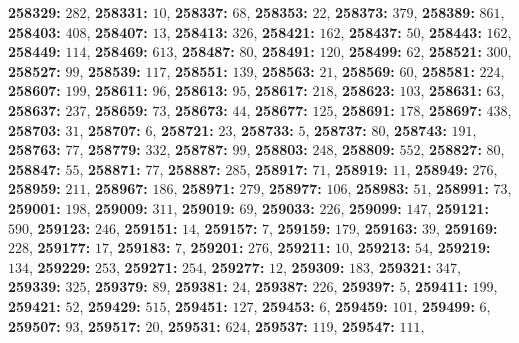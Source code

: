 \textsf{\bfseries 258329:} $282$, \textsf{\bfseries 258331:} $10$, \textsf{\bfseries 258337:} $68$, \textsf{\bfseries 258353:} $22$, \textsf{\bfseries 258373:} $379$, \textsf{\bfseries 258389:} $861$, \textsf{\bfseries 258403:} $408$, \textsf{\bfseries 258407:} $13$, \textsf{\bfseries 258413:} $326$, \textsf{\bfseries 258421:} $162$, \textsf{\bfseries 258437:} $50$, \textsf{\bfseries 258443:} $162$, \textsf{\bfseries 258449:} $114$, \textsf{\bfseries 258469:} $613$, \textsf{\bfseries 258487:} $80$, \textsf{\bfseries 258491:} $120$, \textsf{\bfseries 258499:} $62$, \textsf{\bfseries 258521:} $300$, \textsf{\bfseries 258527:} $99$, \textsf{\bfseries 258539:} $117$, \textsf{\bfseries 258551:} $139$, \textsf{\bfseries 258563:} $21$, \textsf{\bfseries 258569:} $60$, \textsf{\bfseries 258581:} $224$, \textsf{\bfseries 258607:} $199$, \textsf{\bfseries 258611:} $96$, \textsf{\bfseries 258613:} $95$, \textsf{\bfseries 258617:} $218$, \textsf{\bfseries 258623:} $103$, \textsf{\bfseries 258631:} $63$, \textsf{\bfseries 258637:} $237$, \textsf{\bfseries 258659:} $73$, \textsf{\bfseries 258673:} $44$, \textsf{\bfseries 258677:} $125$, \textsf{\bfseries 258691:} $178$, \textsf{\bfseries 258697:} $438$, \textsf{\bfseries 258703:} $31$, \textsf{\bfseries 258707:} $6$, \textsf{\bfseries 258721:} $23$, \textsf{\bfseries 258733:} $5$, \textsf{\bfseries 258737:} $80$, \textsf{\bfseries 258743:} $191$, \textsf{\bfseries 258763:} $77$, \textsf{\bfseries 258779:} $332$, \textsf{\bfseries 258787:} $99$, \textsf{\bfseries 258803:} $248$, \textsf{\bfseries 258809:} $552$, \textsf{\bfseries 258827:} $80$, \textsf{\bfseries 258847:} $55$, \textsf{\bfseries 258871:} $77$, \textsf{\bfseries 258887:} $285$, \textsf{\bfseries 258917:} $71$, \textsf{\bfseries 258919:} $11$, \textsf{\bfseries 258949:} $276$, \textsf{\bfseries 258959:} $211$, \textsf{\bfseries 258967:} $186$, \textsf{\bfseries 258971:} $279$, \textsf{\bfseries 258977:} $106$, \textsf{\bfseries 258983:} $51$, \textsf{\bfseries 258991:} $73$, \textsf{\bfseries 259001:} $198$, \textsf{\bfseries 259009:} $311$, \textsf{\bfseries 259019:} $69$, \textsf{\bfseries 259033:} $226$, \textsf{\bfseries 259099:} $147$, \textsf{\bfseries 259121:} $590$, \textsf{\bfseries 259123:} $246$, \textsf{\bfseries 259151:} $14$, \textsf{\bfseries 259157:} $7$, \textsf{\bfseries 259159:} $179$, \textsf{\bfseries 259163:} $39$, \textsf{\bfseries 259169:} $228$, \textsf{\bfseries 259177:} $17$, \textsf{\bfseries 259183:} $7$, \textsf{\bfseries 259201:} $276$, \textsf{\bfseries 259211:} $10$, \textsf{\bfseries 259213:} $54$, \textsf{\bfseries 259219:} $134$, \textsf{\bfseries 259229:} $253$, \textsf{\bfseries 259271:} $254$, \textsf{\bfseries 259277:} $12$, \textsf{\bfseries 259309:} $183$, \textsf{\bfseries 259321:} $347$, \textsf{\bfseries 259339:} $325$, \textsf{\bfseries 259379:} $89$, \textsf{\bfseries 259381:} $24$, \textsf{\bfseries 259387:} $226$, \textsf{\bfseries 259397:} $5$, \textsf{\bfseries 259411:} $199$, \textsf{\bfseries 259421:} $52$, \textsf{\bfseries 259429:} $515$, \textsf{\bfseries 259451:} $127$, \textsf{\bfseries 259453:} $6$, \textsf{\bfseries 259459:} $101$, \textsf{\bfseries 259499:} $6$, \textsf{\bfseries 259507:} $93$, \textsf{\bfseries 259517:} $20$, \textsf{\bfseries 259531:} $624$, \textsf{\bfseries 259537:} $119$, \textsf{\bfseries 259547:} $111$, 
